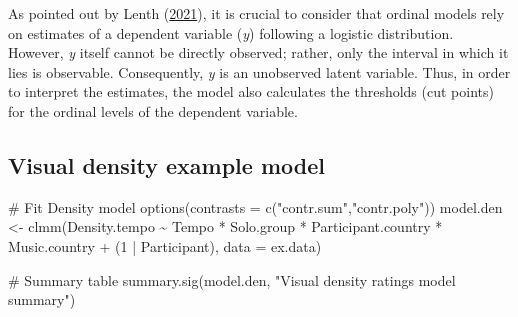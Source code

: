\documentclass[
  bookmarksnumbered]{article}
\newenvironment{Shaded}{\begin{snugshade}}{\end{snugshade}}
\newcommand{\AttributeTok}[1]{\textcolor[rgb]{0.80,0.80,0.80}{#1}}
\newcommand{\CommentTok}[1]{\textcolor[rgb]{0.50,0.62,0.50}{#1}}
\newcommand{\DecValTok}[1]{\textcolor[rgb]{0.86,0.86,0.80}{#1}}
\newcommand{\FunctionTok}[1]{\textcolor[rgb]{0.94,0.94,0.56}{#1}}
\newcommand{\NormalTok}[1]{\textcolor[rgb]{0.80,0.80,0.80}{#1}}
\newcommand{\OtherTok}[1]{\textcolor[rgb]{0.94,0.94,0.56}{#1}}
\newcommand{\SpecialCharTok}[1]{\textcolor[rgb]{0.86,0.64,0.64}{#1}}
\newcommand{\StringTok}[1]{\textcolor[rgb]{0.80,0.58,0.58}{#1}}
\begin{document}
As pointed out by Lenth (\protect\hyperlink{ref-532079}{2021}), it is crucial to consider that ordinal models rely on estimates of a dependent variable (\emph{y}) following a logistic distribution. However, \emph{y} itself cannot be directly observed; rather, only the interval in which it lies is observable. Consequently, \emph{y} is an unobserved latent variable. Thus, in order to interpret the estimates, the model also calculates the thresholds (cut points) for the ordinal levels of the dependent variable.

\hypertarget{visual-density-example-model}{%
\subsection{Visual density example model}\label{visual-density-example-model}}

\begin{Shaded}
\begin{Highlighting}[]
\CommentTok{\# Fit Density model}
\FunctionTok{options}\NormalTok{(}\AttributeTok{contrasts =} \FunctionTok{c}\NormalTok{(}\StringTok{"contr.sum"}\NormalTok{,}\StringTok{"contr.poly"}\NormalTok{))}
\NormalTok{model.den }\OtherTok{\textless{}{-}} \FunctionTok{clmm}\NormalTok{(Density.tempo }\SpecialCharTok{\textasciitilde{}}\NormalTok{ Tempo }\SpecialCharTok{*}\NormalTok{ Solo.group }\SpecialCharTok{*}\NormalTok{ Participant.country }\SpecialCharTok{*}\NormalTok{ Music.country }\SpecialCharTok{+} 
\NormalTok{                    (}\DecValTok{1} \SpecialCharTok{|}\NormalTok{ Participant),}
                  \AttributeTok{data =}\NormalTok{ ex.data)}

\CommentTok{\# Summary table}
\FunctionTok{summary.sig}\NormalTok{(model.den, }\StringTok{"Visual density ratings model summary"}\NormalTok{)}
\end{Highlighting}
\end{Shaded}
\end{document}
